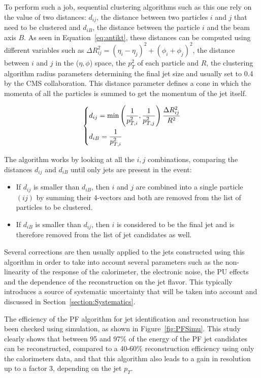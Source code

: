 \documentclass[a4paper, 10pt, openright]{report}
\begin{document}
To perform such a job, sequential clustering algorithms such as this one rely on the value of two distances: $d_{ij}$, the distance between two particles $i$ and $j$ that need to be clustered and $d_{iB}$, the distance between the particle $i$ and the beam axis $B$. As seen in Equation~\ref{eq:antikt}, these distances can be computed using different variables such as $\Delta R_{ij}^2 = (\eta_i - \eta_j)^2 + (\phi_i + \phi_j)^2$, the distance between $i$ and $j$ in the ($\eta, \phi$) space, the $p_T^2$ of each particle and $R$, the clustering algorithm radius parameters determining the final jet size and usually set to 0.4 by the \ac{CMS} collaboration. This distance parameter defines a cone in which the momenta of all the particles is summed to get the momentum of the jet itself.

\begin{equation}
\label{eq:antikt}
\begin{dcases}
d_{ij} = \text{min} \left (\frac{1}{p_{T, i}^2}, \frac{1}{p_{T, j}^2} \right ) \frac{\Delta R_{ij}^2}{R^2} \\
d_{iB} = \frac{1}{p_{T, i}^2}
\end{dcases}
\end{equation}

The algorithm works by looking at all the $i, j$ combinations, comparing the distances $d_{ij}$ and $d_{iB}$ until only jets are present in the event: 
\begin{itemize}
\item If $d_{ij}$ is smaller than $d_{iB}$, then $i$ and $j$ are combined into a single particle $(ij)$ by summing their 4-vectors and both are removed from the list of particles to be clustered.
\item If $d_{iB}$ is smaller than $d_{ij}$, then $i$ is considered to be the final jet and is therefore removed from the list of jet candidates as well.
\end{itemize}

Several corrections are then usually applied to the jets constructed using this algorithm in order to take into account several parameters such as the non-linearity of the response of the calorimeter, the electronic noise, the \ac{PU} effects and the dependence of the reconstruction on the jet flavor. This typically introduces a source of systematic uncertainty that will be taken into account and discussed in Section~\ref{section:Systematics}.

The efficiency of the \ac{PF} algorithm for jet identification and reconstruction has been checked using simulation, as shown in Figure~\ref{fig:PFSimu}. This study clearly shows that between 95 and 97\% of the energy of the \ac{PF} jet candidates can be reconstructed, compared to a 40-60\% reconstruction efficiency using only the calorimeters data, and that this algorithm also leads to a gain in resolution up to a factor 3, depending on the jet $p_T$.
\end{document}
